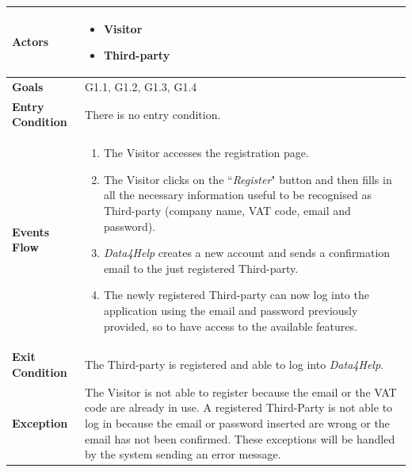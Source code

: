             \begin{table}[H]
            	\centering
                \begin{tabular}{|p{3cm}|p{8.2cm}|}
                    \hline
                    \textbf{Actors} &  \begin{itemize}
                        \item Visitor
                        \item Third-party
                    \end{itemize} \\
                     \hline
                    \textbf{Goals} & G1.1, G1.2, G1.3, G1.4 \\ 
                     \hline
                    \textbf{Entry Condition} & There is no entry condition. \\
                     \hline
                    \textbf{Events Flow} & \begin{enumerate}
                        \item The Visitor accesses the registration page.
                        \item The Visitor clicks on the ``\emph{Register}" button and then fills in all the necessary information useful to be recognised as Third-party (company name, VAT code, email and password).
                        \item \emph{Data4Help} creates a new account and sends a confirmation email to the just registered Third-party.
                        \item The newly registered Third-party can now log into the application using the email and password previously provided, so to have access to the available features.
                    \end{enumerate} \\
                     \hline
                    \textbf{Exit Condition} & The Third-party is registered and able to log into \emph{Data4Help}. \\
                     \hline
                    \textbf{Exception} & The Visitor is not able to register because the email or the VAT code                      are already in use. \newline
                                         A registered Third-Party is not able to log in because the email or password inserted are wrong or the email has not been confirmed. \newline
                                         These exceptions will be handled by the system sending an error message. \\
                     \hline
                \end{tabular}  
            \end{table}
            
